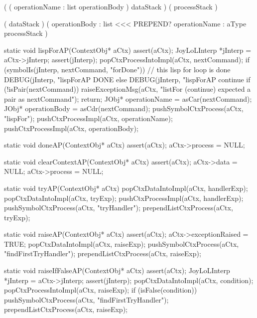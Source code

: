 \starttyping

\startWord[lispInterpret]

\preDataStack
  (
    (
      operationName : list
      operationBody
    )
    dataStack 
  )
\preProcessStack
  (
    processStack
  )
\preConditions
\stopPreStack

\postDataStack
  ( dataStack )
\postProcessStack
  (
    operationBody : list <<< PREPEND?
    operationName : aType
    processStack
  )
\postConditions
\stopPostStack

\stopWord

\stoptyping

\startCCode
static void lispForAP(ContextObj* aCtx) {
  assert(aCtx);
  JoyLoLInterp *jInterp = aCtx->jInterp;
  assert(jInterp);
  popCtxProcessIntoImpl(aCtx, nextCommand);
  if (symbolIs(jInterp, nextCommand, "forDone")) {
    // this lisp for loop is done
    DEBUG(jInterp, "lispForAP DONE%
  } else {
    DEBUG(jInterp, "lispForAP continue%
    if (!isPair(nextCommand)) {
      raiseExceptionMsg(aCtx,
        "listFor (continue) expected a pair as nextCommand");
      return;
    }
    JObj* operationName = asCar(nextCommand);
    JObj* operationBody = asCdr(nextCommand);
    pushSymbolCtxProcess(aCtx, "lispFor");
    pushCtxProcessImpl(aCtx, operationName);
    pushCtxProcessImpl(aCtx, operationBody);
  }
}
\stopCCode

\startCCode
static void doneAP(ContextObj* aCtx) {
  assert(aCtx);
  aCtx->process = NULL;
}
\stopCCode

\startCCode
static void clearContextAP(ContextObj* aCtx) {
  assert(aCtx);
  aCtx->data    = NULL;
  aCtx->process = NULL;
}
\stopCCode

\startCCode
static void tryAP(ContextObj* aCtx) {
  popCtxDataIntoImpl(aCtx, handlerExp);
  popCtxDataIntoImpl(aCtx, tryExp);
  pushCtxProcessImpl(aCtx, handlerExp);
  pushSymbolCtxProcess(aCtx, "tryHandler");
  prependListCtxProcess(aCtx, tryExp);
}
\stopCCode

\startCCode
static void raiseAP(ContextObj* aCtx) {
  assert(aCtx);
  aCtx->exceptionRaised = TRUE;
  popCtxDataIntoImpl(aCtx, raiseExp);
  pushSymbolCtxProcess(aCtx, "findFirstTryHandler");
  prependListCtxProcess(aCtx, raiseExp);
}
\stopCCode

\startCCode
static void raiseIfFalseAP(ContextObj* aCtx) {
  assert(aCtx);
  JoyLoLInterp *jInterp = aCtx->jInterp;
  assert(jInterp);
  popCtxDataIntoImpl(aCtx, condition);
  popCtxProcessIntoImpl(aCtx, raiseExp);
  if (isFalse(condition)) {
    pushSymbolCtxProcess(aCtx, "findFirstTryHandler");
    prependListCtxProcess(aCtx, raiseExp);
  }
}
\stopCCode

